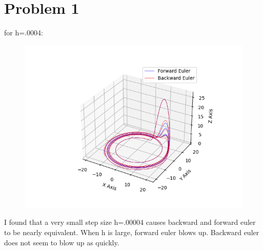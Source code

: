 \documentclass{article}
\title{\thetitle}
\author{\theauthor}
\begin{document}
\maketitle
\section* {Problem 1}
for h=.0004:
\begin{figure}[!h]
\centering
\includegraphics[width=1.0\textwidth]{figs/both.png}
\end{figure}
\newpage
I found that a very small step size h=.00004 causes backward and forward euler to be nearly equivalent. When h is large, forward euler blows up. Backward euler does not seem to blow up as quickly. 
\end{document}
